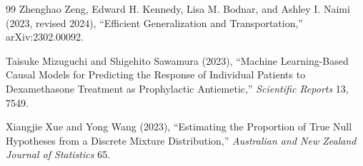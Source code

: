 \documentclass{article}
\begin{document}
\begin{thebibliography}{99}
   Zhenghao Zeng, Edward H. Kennedy, Lisa M. Bodnar, and Ashley I. Naimi (2023, revised 2024), ``Efficient Generalization and Transportation,'' arXiv:2302.00092.

   Taisuke Mizuguchi and Shigehito Sawamura (2023), ``Machine Learning-Based Causal Models for Predicting the Response of Individual Patients to Dexamethasone Treatment as Prophylactic Antiemetic,'' \emph{Scientific Reports} 13, 7549.

   Xiangjie Xue and Yong Wang (2023), ``Estimating the Proportion of True Null Hypotheses from a Discrete Mixture Distribution,'' \emph{Australian and New Zealand Journal of Statistics} 65.

\end{thebibliography}
\end{document}
